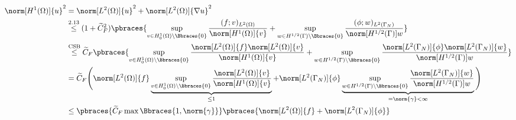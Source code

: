 \begin{solution}
\begin{enumerate}[label = (\roman*)]
    \begin{align*}
        \norm[H^1(\Omega)]{u}^2
        & =
        \norm[L^2(\Omega)]{u}^2
        +
        \norm[L^2(\Omega)]{\nabla u}^2 \\
        & \stackrel
        {
            \text{2.13}
        }{\leq}
        (1 + \widetilde{C}_F^2)
        \pbraces
        {
            \sup_{v \in H_0^1(\Omega) \setminus \Bbraces{0}}
            \frac
            {
                (f; v)_{L^2(\Omega)}
            }{
                \norm[H^1(\Omega)]{v}
            }
            +
            \sup_{w \in H^{1/2}(\Gamma) \setminus \Bbraces{0}}
            \frac
            {
                (\phi; w)_{L^2(\Gamma_N)}
            }{
                \norm[H^{1/2}(\Gamma)]{w}
            }
        } \\
        & \stackrel{\text{CSB}}{\leq}
        \widetilde{C}_F
        \pbraces
        {
            \sup_{v \in H_0^1(\Omega) \setminus \Bbraces{0}}
            \frac
            {
                \norm[L^2(\Omega)]{f}
                \norm[L^2(\Omega)]{v}
            }{
                \norm[H^1(\Omega)]{v}
            }
            +
            \sup_{w \in H^{1/2}(\Gamma) \setminus \Bbraces{0}}
            \frac
            {
                \norm[L^2(\Gamma_N)]{\phi}
                \norm[L^2(\Gamma_N)]{w}
            }{
                \norm[H^{1/2}(\Gamma)]{w}
            }
        } \\
        & =
        \widetilde{C}_F
        \Bigg (
            \norm[L^2(\Omega)]{f}
            \underbrace
            {
                \sup_{v \in H_0^1(\Omega) \setminus \Bbraces{0}}
                \frac
                {
                    \norm[L^2(\Omega)]{v}
                }{
                    \norm[H^1(\Omega)]{v}
                }
            }_{
                \leq 1
            }
            +
            \norm[L^2(\Gamma_N)]{\phi}
            \underbrace
            {
                \sup_{w \in H^{1/2}(\Gamma) \setminus \Bbraces{0}}
                \frac
                {
                    \norm[L^2(\Gamma_N)]{w}
                }{
                    \norm[H^{1/2}(\Gamma)]{w}
                }
            }_{
                =
                \norm{\gamma}
                <
                \infty
            }
        \Bigg ) \\
        & \leq
        \pbraces
        {
            \widetilde{C}_F
            \max \Bbraces{1, \norm{\gamma}}
        }
        \pbraces
        {
            \norm[L^2(\Omega)]{f}
            +
            \norm[L^2(\Gamma_N)]{\phi}
        }
    \end{align*}


\end{enumerate}
\end{solution}
